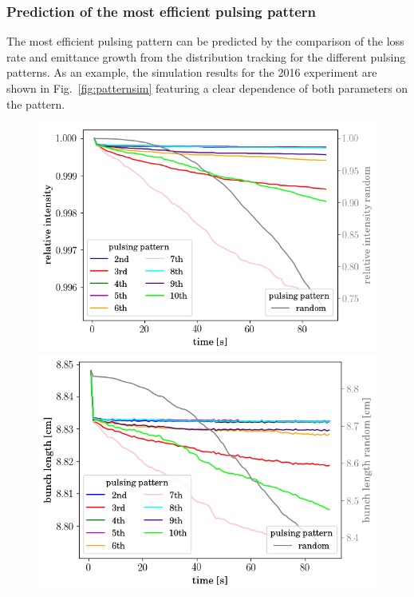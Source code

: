 \documentclass[%
 reprint,
 amsmath,amssymb,
 aps,
prstab,
]{revtex4-1}
\begin{document}
\subsubsection{Prediction of the most efficient pulsing pattern\label{sec:pattern}}
The most efficient pulsing pattern can be predicted by the comparison of the loss rate and emittance growth from the distribution tracking for the different pulsing patterns. As an example, the simulation results for the 2016 experiment are shown in Fig.~\ref{fig:patternsim} featuring a clear dependence of both parameters on the pattern.
\begin{figure}[h]
	\begin{minipage}[t]{0.49\linewidth}
		\centering
		\includegraphics[width=1.0\linewidth]{2016injerra2b2u_pattern_3_5um_intensity.png}
	\end{minipage}
	\begin{minipage}[t]{0.49\linewidth}
		\centering
		\includegraphics[width=1.0\linewidth]{2016injerra2b2u_pattern_3_5um_sigm.png}

\end{minipage}
\end{figure}
\end{document}
